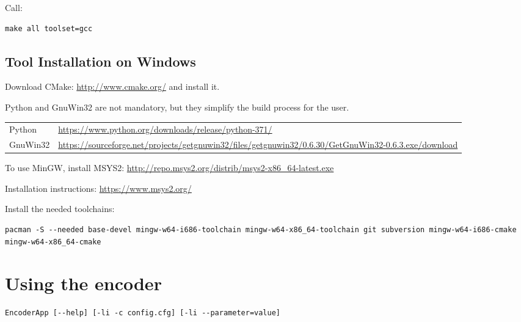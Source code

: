 \documentclass[a4paper,11pt]{jvetdoc}
\begin{document}
Call:
\begin{verbatim}
make all toolset=gcc
\end{verbatim}

\subsection{Tool Installation on Windows}
\label{windowsinstall}

Download CMake: \url{http://www.cmake.org/} and install it.

Python and GnuWin32 are not mandatory, but they simplify the build process for the user.

\begin{table}[ht]
\footnotesize
\centering
\begin{tabular}{ll}
\hline
Python     &    \url{https://www.python.org/downloads/release/python-371/} \\
GnuWin32   &    \url{https://sourceforge.net/projects/getgnuwin32/files/getgnuwin32/0.6.30/GetGnuWin32-0.6.3.exe/download} \\
\hline
\end{tabular}
\end{table}

To use MinGW, install MSYS2:
\url{http://repo.msys2.org/distrib/msys2-x86_64-latest.exe}

Installation instructions:
\url{https://www.msys2.org/}

Install the needed toolchains:
\begin{verbatim}
pacman -S --needed base-devel mingw-w64-i686-toolchain mingw-w64-x86_64-toolchain git subversion mingw-w64-i686-cmake mingw-w64-x86_64-cmake
\end{verbatim}

\section{Using the encoder}

\begin{verbatim}
EncoderApp [--help] [-li -c config.cfg] [-li --parameter=value]
\end{verbatim}
\end{document}
